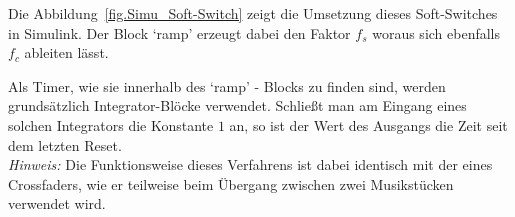 Die Abbildung~\ref{fig.Simu_Soft-Switch} zeigt die Umsetzung dieses Soft-Switches in Simulink. Der Block `ramp' erzeugt dabei den Faktor $f_s$ woraus sich ebenfalls $f_c$ ableiten lässt.

Als Timer, wie sie innerhalb des `ramp' - Blocks zu finden sind, werden grundsätzlich Integrator-Blöcke verwendet. Schließt man am Eingang eines solchen Integrators die Konstante $1$ an, so ist der Wert des Ausgangs die Zeit seit dem letzten Reset.\\

\textit{Hinweis:} Die Funktionsweise dieses Verfahrens ist dabei identisch mit der eines Crossfaders, wie er teilweise beim Übergang zwischen zwei Musikstücken verwendet wird.

